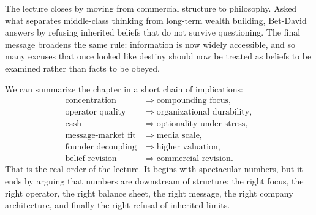 The lecture closes by moving from commercial structure to philosophy. Asked what separates middle-class thinking from long-term wealth building, Bet-David answers by refusing inherited beliefs that do not survive questioning. The final message broadens the same rule: information is now widely accessible, and so many excuses that once looked like destiny should now be treated as beliefs to be examined rather than facts to be obeyed.

We can summarize the chapter in a short chain of implications:
\begin{align}
\text{concentration} &\Rightarrow \text{compounding focus},\\
\text{operator quality} &\Rightarrow \text{organizational durability},\\
\text{cash} &\Rightarrow \text{optionality under stress},\\
\text{message-market fit} &\Rightarrow \text{media scale},\\
\text{founder decoupling} &\Rightarrow \text{higher valuation},\\
\text{belief revision} &\Rightarrow \text{commercial revision}.
\end{align}
That is the real order of the lecture. It begins with spectacular numbers, but it ends by arguing that numbers are downstream of structure: the right focus, the right operator, the right balance sheet, the right message, the right company architecture, and finally the right refusal of inherited limits.